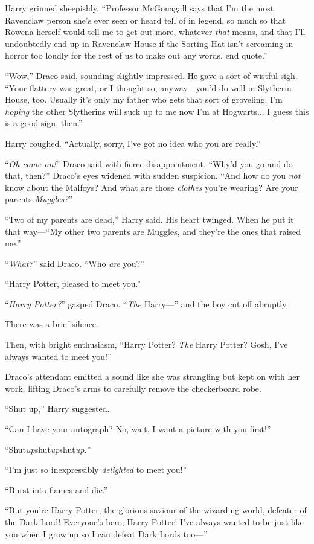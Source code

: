 Harry grinned sheepishly. “Professor McGonagall says that I’m the most Ravenclaw person she’s ever seen or heard tell of in legend, so much so that Rowena herself would tell me to get out more, whatever \emph{that} means, and that I’ll undoubtedly end up in Ravenclaw House if the Sorting Hat isn’t screaming in horror too loudly for the rest of us to make out any words, end quote.”

“Wow,” Draco said, sounding slightly impressed. He gave a sort of wistful sigh. “Your flattery was great, or I thought so, anyway—you’d do well in Slytherin House, too. Usually it’s only my father who gets that sort of groveling. I’m \emph{hoping} the other Slytherins will suck up to me now I’m at Hogwarts... I guess this is a good sign, then.”

Harry coughed. “Actually, sorry, I’ve got no idea who you are really.”

“\emph{Oh come on!}” Draco said with fierce disappointment. “Why’d you go and do that, then?” Draco’s eyes widened with sudden suspicion. “And how do you \emph{not} know about the Malfoys? And what are those \emph{clothes} you’re wearing? Are your parents \emph{Muggles?}”

“Two of my parents are dead,” Harry said. His heart twinged. When he put it that way—“My other two parents are Muggles, and they’re the ones that raised me.”

“\emph{What?}” said Draco. “Who \emph{are} you?”

“Harry Potter, pleased to meet you.”

“\emph{Harry Potter?}” gasped Draco. “\emph{The} Harry—” and the boy cut off abruptly.

There was a brief silence.

Then, with bright enthusiasm, “Harry Potter? \emph{The} Harry Potter? Gosh, I’ve always wanted to meet you!”

Draco’s attendant emitted a sound like she was strangling but kept on with her work, lifting Draco’s arms to carefully remove the checkerboard robe.

“Shut up,” Harry suggested.

“Can I have your autograph? No, wait, I want a picture with you first!”

“Shut\emph{up}shut\emph{up}shut\emph{up.}”

“I’m just so inexpressibly \emph{delighted} to meet you!”

“Burst into flames and die.”

“But you’re Harry Potter, the glorious saviour of the wizarding world, defeater of the Dark Lord! Everyone’s hero, Harry Potter! I’ve always wanted to be just like you when I grow up so I can defeat Dark Lords too—”

